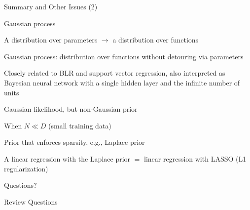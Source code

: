 \documentclass[handout,fleqn,aspectratio=169]{beamer}
\begin{document}
\begin{frame}{Summary and Other Issues (2)}

\plitemsep 0.1in

\bci 

\item Gaussian process
\bci
\item A distribution over parameters $\rightarrow$ a distribution over functions
\item Gaussian process: distribution over functions without detouring via parameters
\item Closely related to BLR and support vector regression, also interpreted as Bayesian neural network with a single hidden layer and the infinite number of units
\eci

\item Gaussian likelihood, but non-Gaussian prior
\bci
\item When $N \ll D$ (small training data)
\item Prior that enforces sparsity, e.g., Laplace prior 
\item A linear regression with the Laplace prior $=$ linear regression with LASSO (L1 regularization)
\eci
\eci
\end{frame}


\begin{frame}{}
\vspace{2cm}
\LARGE Questions?


\end{frame}

\begin{frame}{Review Questions}
\bce[1)]
\item 

\ece
\end{frame}
\end{document}
